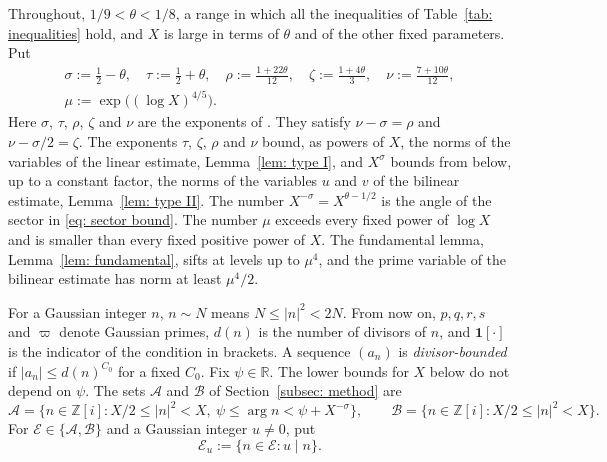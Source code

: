 \documentclass{article}
\numberwithin{equation}{section}
\newcommand{\Le}{\leqslant}
\begin{document}
Throughout, $1/9 < \theta < 1/8$, a range in which all the inequalities of Table~\ref{tab: inequalities} hold, and $X$ is large in terms of $\theta$ and of the other fixed parameters. Put
\begin{equation}
\label{eq: parameters}
\begin{gathered}
\sigma := \frac12 - \theta, \quad \tau := \frac12 + \theta, \quad \rho := \frac{1 + 22\theta}{12}, \quad \zeta := \frac{1 + 4\theta}{3}, \quad \nu := \frac{7 + 10\theta}{12}, \\
\mu := \exp\bigl( (\log X)^{4/5} \bigr).
\end{gathered}
\end{equation}
Here $\sigma$, $\tau$, $\rho$, $\zeta$ and $\nu$ are the exponents of \citet[p.~120]{harman2001gaussian}. They satisfy $\nu - \sigma = \rho$ and $\nu - \sigma/2 = \zeta$. The exponents $\tau$, $\zeta$, $\rho$ and $\nu$ bound, as powers of $X$, the norms of the variables of the linear estimate, Lemma~\ref{lem: type I}, and $X^{\sigma}$ bounds from below, up to a constant factor, the norms of the variables $u$ and $v$ of the bilinear estimate, Lemma~\ref{lem: type II}. The number $X^{-\sigma} = X^{\theta - 1/2}$ is the angle of the sector in \eqref{eq: sector bound}. The number $\mu$ exceeds every fixed power of $\log X$ and is smaller than every fixed positive power of $X$. The fundamental lemma, Lemma~\ref{lem: fundamental}, sifts at levels up to $\mu^4$, and the prime variable of the bilinear estimate has norm at least $\mu^4/2$.

For a Gaussian integer $n$, $n \sim N$ means $N \Le |n|^2 < 2N$. From now on, $p, q, r, s$ and $\varpi$ denote Gaussian primes, $d(n)$ is the number of divisors of $n$, and $\mathbf{1}[\cdot]$ is the indicator of the condition in brackets. A sequence $(a_n)$ is \emph{divisor-bounded} if $|a_n| \Le d(n)^{C_0}$ for a fixed $C_0$. Fix $\psi \in \mathbb{R}$. The lower bounds for $X$ below do not depend on $\psi$. The sets $\mathcal{A}$ and $\mathcal{B}$ of Section~\ref{subsec: method} are
\begin{equation}
\label{eq: sets}
\mathcal{A} = \{ n \in \mathbb{Z}[i] : X/2 \Le |n|^2 < X,\ \psi \Le \arg n < \psi + X^{-\sigma} \}, \qquad \mathcal{B} = \{ n \in \mathbb{Z}[i] : X/2 \Le |n|^2 < X \}.
\end{equation}
For $\mathcal{E} \in \{\mathcal{A}, \mathcal{B}\}$ and a Gaussian integer $u \neq 0$, put
\begin{equation}
\label{eq: multiples}
\mathcal{E}_u := \{ n \in \mathcal{E} : u \mid n \}.
\end{equation}
\end{document}
